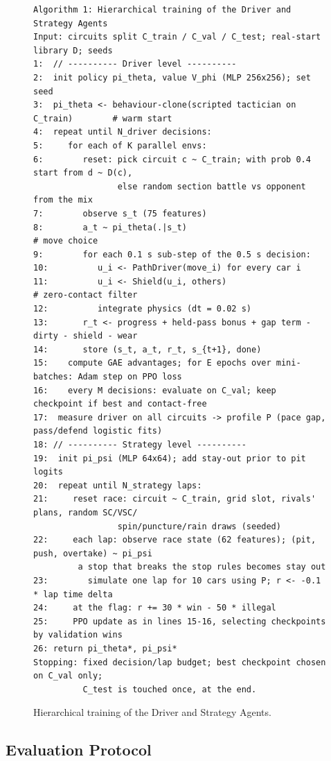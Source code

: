 \documentclass{ieeeaccess}
\begin{document}
\begin{figure}[!t]
\footnotesize
\begin{verbatim}
Algorithm 1: Hierarchical training of the Driver and Strategy Agents
Input: circuits split C_train / C_val / C_test; real-start library D; seeds
1:  // ---------- Driver level ----------
2:  init policy pi_theta, value V_phi (MLP 256x256); set seed
3:  pi_theta <- behaviour-clone(scripted tactician on C_train)        # warm start
4:  repeat until N_driver decisions:
5:     for each of K parallel envs:
6:        reset: pick circuit c ~ C_train; with prob 0.4 start from d ~ D(c),
                 else random section battle vs opponent from the mix
7:        observe s_t (75 features)
8:        a_t ~ pi_theta(.|s_t)                                      # move choice
9:        for each 0.1 s sub-step of the 0.5 s decision:
10:          u_i <- PathDriver(move_i) for every car i
11:          u_i <- Shield(u_i, others)                              # zero-contact filter
12:          integrate physics (dt = 0.02 s)
13:       r_t <- progress + held-pass bonus + gap term - dirty - shield - wear
14:       store (s_t, a_t, r_t, s_{t+1}, done)
15:    compute GAE advantages; for E epochs over mini-batches: Adam step on PPO loss
16:    every M decisions: evaluate on C_val; keep checkpoint if best and contact-free
17:  measure driver on all circuits -> profile P (pace gap, pass/defend logistic fits)
18: // ---------- Strategy level ----------
19:  init pi_psi (MLP 64x64); add stay-out prior to pit logits
20:  repeat until N_strategy laps:
21:     reset race: circuit ~ C_train, grid slot, rivals' plans, random SC/VSC/
                 spin/puncture/rain draws (seeded)
22:     each lap: observe race state (62 features); (pit, push, overtake) ~ pi_psi
         a stop that breaks the stop rules becomes stay out
23:        simulate one lap for 10 cars using P; r <- -0.1 * lap time delta
24:     at the flag: r += 30 * win - 50 * illegal
25:     PPO update as in lines 15-16, selecting checkpoints by validation wins
26: return pi_theta*, pi_psi*
Stopping: fixed decision/lap budget; best checkpoint chosen on C_val only;
          C_test is touched once, at the end.
\end{verbatim}
\caption{Hierarchical training of the Driver and Strategy Agents.}
\label{alg:1}
\end{figure}

\subsection{Evaluation Protocol}
\end{document}
